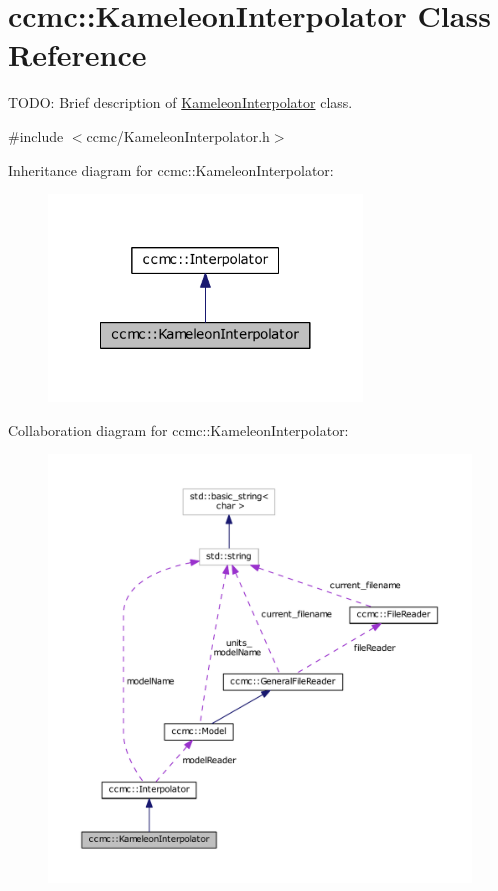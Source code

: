 \hypertarget{classccmc_1_1_kameleon_interpolator}{\section{ccmc\-:\-:Kameleon\-Interpolator Class Reference}
\label{classccmc_1_1_kameleon_interpolator}
}


T\-O\-D\-O\-: Brief description of \hyperlink{classccmc_1_1_kameleon_interpolator}{Kameleon\-Interpolator} class.  




{\ttfamily \#include $<$ccmc/\-Kameleon\-Interpolator.\-h$>$}



Inheritance diagram for ccmc\-:\-:Kameleon\-Interpolator\-:
\nopagebreak
\begin{figure}[H]
\begin{center}
\leavevmode
\includegraphics[width=236pt]{classccmc_1_1_kameleon_interpolator__inherit__graph}
\end{center}
\end{figure}


Collaboration diagram for ccmc\-:\-:Kameleon\-Interpolator\-:
\nopagebreak
\begin{figure}[H]
\begin{center}
\leavevmode
\includegraphics[width=350pt]{classccmc_1_1_kameleon_interpolator__coll__graph}
\end{center}
\end{figure}
